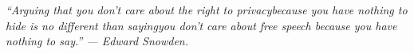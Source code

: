 \documentclass[12pt, twoside]{book}
\begin{document}


\cleardoublepage
\begin{flushright}
\thispagestyle{empty}
\null{}
\textit{
    “Arguing that you don't care about the right to privacy\break because you have nothing to hide is no different than saying\break you don't care about free speech because you have nothing to say.”
    \break --- Edward Snowden.}
\null
\end{flushright}
\cleardoublepage

\tableofcontents

\listoffigures












%
\printbibliography[heading=bibintoc]
\end{document}
